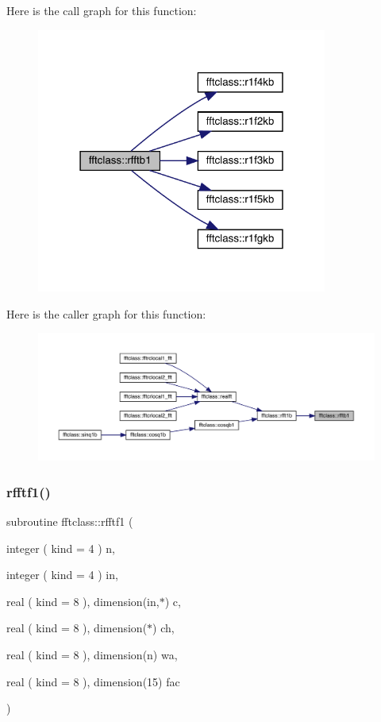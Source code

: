 Here is the call graph for this function\+:\nopagebreak
\begin{figure}[H]
\begin{center}
\leavevmode
\includegraphics[width=271pt]{namespacefftclass_a338a7a4db13f2357c42a682142df3190_cgraph}
\end{center}
\end{figure}
Here is the caller graph for this function\+:\nopagebreak
\begin{figure}[H]
\begin{center}
\leavevmode
\includegraphics[width=350pt]{namespacefftclass_a338a7a4db13f2357c42a682142df3190_icgraph}
\end{center}
\end{figure}
\mbox{\label{namespacefftclass_af9f24f143ca02395c91f7757343e8003}} 
\subsubsection{\texorpdfstring{rfftf1()}{rfftf1()}}
{\footnotesize\ttfamily subroutine fftclass\+::rfftf1 (\begin{DoxyParamCaption}\item[{integer ( kind = 4 )}]{n,  }\item[{integer ( kind = 4 )}]{in,  }\item[{real ( kind = 8 ), dimension(in,$\ast$)}]{c,  }\item[{real ( kind = 8 ), dimension($\ast$)}]{ch,  }\item[{real ( kind = 8 ), dimension(n)}]{wa,  }\item[{real ( kind = 8 ), dimension(15)}]{fac }\end{DoxyParamCaption})}


